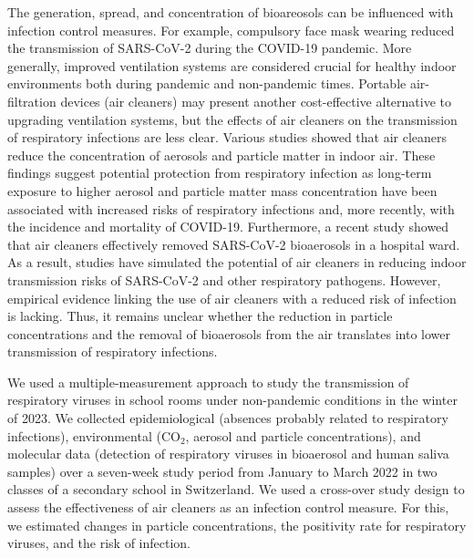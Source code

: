 \documentclass[fleqn,11pt]{wlscirep}
\begin{document}
The generation, spread, and concentration of bioareosols can be influenced with infection control measures. For example, compulsory face mask wearing reduced the transmission of SARS-CoV-2 during the COVID-19 pandemic\cite{Gettings2021,Heinsohn2022,Leech2022PNAS,Mitze2020PNAS}. More generally, improved ventilation systems are considered crucial for healthy indoor environments both during pandemic and non-pandemic times\cite{Wang2021,Morawska2021}. Portable air-filtration devices (air cleaners) may present another cost-effective alternative to upgrading ventilation systems, but the effects of air cleaners on the transmission of respiratory infections are less clear. Various studies showed that air cleaners reduce the concentration of aerosols and particle matter in indoor air\cite{Park2020Build,Buising2022InfContr,Ren2021Dent,Banholzer2023PLoSMed}. These findings suggest potential protection from respiratory infection as long-term exposure to higher aerosol and particle matter mass concentration have been associated with increased risks of respiratory infections\cite{Gordon2014Resp} and, more recently, with the incidence and mortality of COVID-19\cite{Kelly2023Atmos,Veronesi2022OccEnvMed,Travaglio2021EnvPoll,DeAngelis2021EnvRes}. Furthermore, a recent study showed that air cleaners effectively removed SARS-CoV-2 bioaerosols in a hospital ward\cite{Morris2022}. As a result, studies have simulated the potential of air cleaners in reducing indoor transmission risks of SARS-CoV-2\cite{Lindsley2021} and other respiratory pathogens\cite{Cortellessa2023Build}. However, empirical evidence linking the use of air cleaners with a reduced risk of infection is lacking. Thus, it remains unclear whether the reduction in particle concentrations and the removal of bioaerosols from the air translates into lower transmission of respiratory infections. 

We used a multiple-measurement approach to study the transmission of respiratory viruses in school rooms under non-pandemic conditions in the winter of 2023. We collected epidemiological (absences probably related to respiratory infections), environmental (CO$_2$, aerosol and particle concentrations), and molecular data (detection of respiratory viruses in bioaerosol and human saliva samples) over a seven-week study period from January to March 2022 in two classes of a secondary school in Switzerland. We used a cross-over study design to assess the effectiveness of air cleaners as an infection control measure. For this, we estimated changes in particle concentrations, the positivity rate for respiratory viruses, and the risk of infection.
\end{document}
